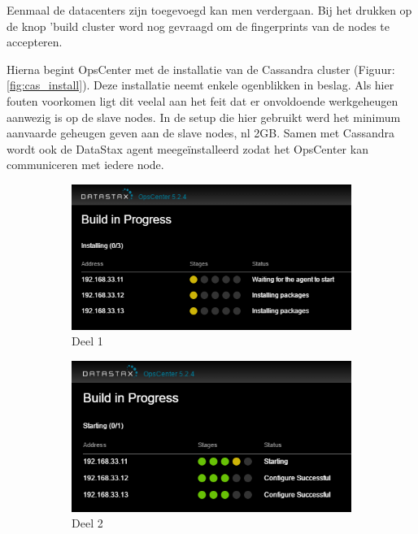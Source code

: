 Eenmaal de datacenters zijn toegevoegd kan men verdergaan.
Bij het drukken op de knop 'build cluster word nog gevraagd om de fingerprints van de nodes te accepteren.

Hierna begint OpsCenter met de installatie van de Cassandra cluster (Figuur: \ref{fig:cas_install}).
Deze installatie neemt enkele ogenblikken in beslag.
Als hier fouten voorkomen ligt dit veelal aan het feit dat er onvoldoende werkgeheugen aanwezig is op de slave nodes.
In de setup die hier gebruikt werd het minimum aanvaarde geheugen geven aan de slave nodes, nl 2GB.
Samen met Cassandra wordt ook de DataStax agent meegeïnstalleerd zodat het OpsCenter kan communiceren met iedere node.

\begin{figure}[H]
	\centering
	\begin{subfigure}{.49\textwidth}
  		\centering
  		\includegraphics[width=.9\linewidth]{img/4_installatie_cassandra/1_Configuration_part_4}
  		\caption{Deel 1}
	\end{subfigure}
	\begin{subfigure}{.49\textwidth}
  		\centering
  		\includegraphics[width=.9\linewidth]{img/4_installatie_cassandra/1_Configuration_part_5}
  		\caption{Deel 2}
	\end{subfigure}
	\begin{subfigure}{.49\textwidth}

\end{subfigure}
\end{figure}
